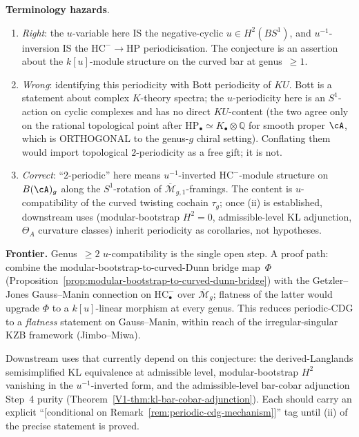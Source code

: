 \begin{remark}
\medskip
\noindent\textbf{Terminology hazards}.
\begin{enumerate}[label=\textup{(\alph*)}]
\item \emph{Right}: the $u$-variable here IS the
negative-cyclic $u \in H^2(BS^1)$, and $u^{-1}$-inversion IS
the $\mathrm{HC}^- \to \mathrm{HP}$ periodicisation. The
conjecture is an assertion about the $k[u]$-module structure
on the curved bar at genus~$\geq 1$.
\item \emph{Wrong}: identifying this periodicity with Bott
periodicity of $KU$. Bott is a statement about complex
$K$-theory spectra; the $u$-periodicity here is an
$S^1$-action on cyclic complexes and has no direct
$KU$-content (the two agree only on the rational topological
point after
$\mathrm{HP}_\bullet \simeq K_\bullet \otimes \mathbb{Q}$ for
smooth proper $\cA$, which is ORTHOGONAL to the genus-$g$
chiral setting). Conflating them would import topological
$2$-periodicity as a free gift; it is not.
\item \emph{Correct}: ``$2$-periodic'' here means
$u^{-1}$-inverted $\mathrm{HC}^-$-module structure on
$B(\cA)_g$ along the $S^1$-rotation of
$\overline{\mathcal{M}}_{g,1}$-framings. The content is
$u$-compatibility of the curved twisting cochain $\tau_g$;
once (ii) is established, downstream uses
(modular-bootstrap $H^2 = 0$, admissible-level KL adjunction,
$\Theta_A$ curvature classes) inherit periodicity as
corollaries, not hypotheses.
\end{enumerate}

\medskip
\noindent\textbf{Frontier.} Genus~$\geq 2$ $u$-compatibility is
the single open step. A proof path: combine the
modular-bootstrap-to-curved-Dunn bridge map~$\Phi$
(Proposition~\ref{prop:modular-bootstrap-to-curved-dunn-bridge})
with the Getzler--Jones Gauss--Manin connection on
$\mathrm{HC}^-_\bullet$ over $\overline{\mathcal{M}}_g$; flatness
of the latter would upgrade $\Phi$ to a $k[u]$-linear morphism at
every genus. This reduces periodic-CDG to a \emph{flatness}
statement on Gauss--Manin, within reach of the irregular-singular
KZB framework (Jimbo--Miwa).

\medskip
\noindent Downstream uses that currently depend on this
conjecture: the derived-Langlands semisimplified KL equivalence at
admissible level, modular-bootstrap $H^2$ vanishing in the
$u^{-1}$-inverted form, and the admissible-level bar-cobar
adjunction Step~4 purity
(Theorem~\ref{V1-thm:kl-bar-cobar-adjunction}).
Each should carry an explicit
``\textup{[conditional on Remark~\ref{rem:periodic-cdg-mechanism}]}''
tag until (ii) of the precise statement is proved.
\end{remark}

